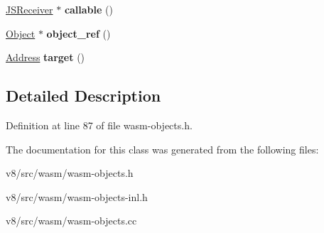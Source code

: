 \begin{DoxyCompactItemize}
\mbox{\label{classv8_1_1internal_1_1ImportedFunctionEntry_aad61d3e25df683ce5bb9a042c1a24e4d}} 
\mbox{\hyperlink{classv8_1_1internal_1_1JSReceiver}{J\+S\+Receiver}} $\ast$ {\bfseries callable} ()
\item 
\mbox{\label{classv8_1_1internal_1_1ImportedFunctionEntry_ac5662605291f13c592848f90a307ae58}} 
\mbox{\hyperlink{classv8_1_1internal_1_1Object}{Object}} $\ast$ {\bfseries object\+\_\+ref} ()
\item 
\mbox{\label{classv8_1_1internal_1_1ImportedFunctionEntry_a0b49e1503e3a078a518cee118aa26157}} 
\mbox{\hyperlink{classuintptr__t}{Address}} {\bfseries target} ()
\end{DoxyCompactItemize}


\subsection{Detailed Description}


Definition at line 87 of file wasm-\/objects.\+h.



The documentation for this class was generated from the following files\+:\begin{DoxyCompactItemize}
\item 
v8/src/wasm/wasm-\/objects.\+h\item 
v8/src/wasm/wasm-\/objects-\/inl.\+h\item 
v8/src/wasm/wasm-\/objects.\+cc\end{DoxyCompactItemize}
